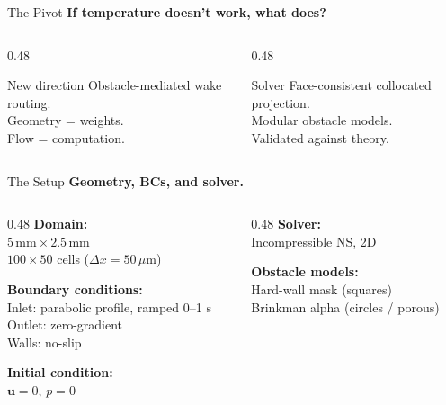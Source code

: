 \documentclass[aspectratio=169,11pt]{beamer}
\begin{document}
\begin{frame}{The Pivot}
  \textbf{If temperature doesn't work, what does?}

  \vspace{0.5cm}
  \begin{columns}[T]
    \begin{column}{0.48\textwidth}
      \begin{block}{\footnotesize New direction}
        \footnotesize
        Obstacle-mediated wake routing.\\
        Geometry = weights.\\
        Flow = computation.
      \end{block}
    \end{column}
    \begin{column}{0.48\textwidth}
      \begin{block}{\footnotesize Solver}
        \footnotesize
        Face-consistent collocated projection.\\
        Modular obstacle models.\\
        Validated against theory.
      \end{block}
    \end{column}
  \end{columns}
\end{frame}

\begin{frame}{The Setup}
  \textbf{Geometry, BCs, and solver.}

  \vspace{0.3cm}
  \begin{columns}[T]
    \begin{column}{0.48\textwidth}
      \footnotesize
      \textbf{Domain:}\\
      $5\,\text{mm} \times 2.5\,\text{mm}$\\
      $100 \times 50$ cells ($\Delta x = 50\,\mu\text{m}$)

      \vspace{0.3cm}
      \textbf{Boundary conditions:}\\
      Inlet: parabolic profile, ramped 0--1 s\\
      Outlet: zero-gradient\\
      Walls: no-slip

      \vspace{0.3cm}
      \textbf{Initial condition:}\\
      $\mathbf{u} = 0$, $p = 0$
    \end{column}
    \begin{column}{0.48\textwidth}
      \footnotesize
      \textbf{Solver:}\\
      Incompressible NS, 2D

      \vspace{0.3cm}
      \textbf{Obstacle models:}\\
      Hard-wall mask (squares)\\
      Brinkman alpha (circles / porous)
    \end{column}
  \end{columns}
\end{frame}
\end{document}
